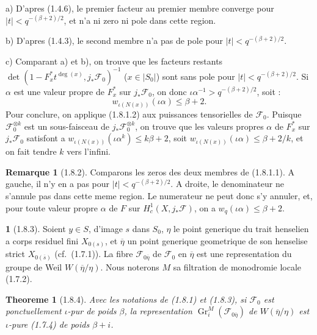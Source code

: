 \documentclass[12pt,a4paper]{article}
\theoremstyle{plain}
\newtheorem{theoreme}{Theoreme}[section]
\theoremstyle{definition}
\newtheorem{remarque}[theorem]{Remarque}
\theoremstyle{definition}
\newtheorem{para}{}[section]
\theoremstyle{remark}
\DeclareMathOperator{\Gr}{Gr}
\begin{document}
a) D'apres (1.4.6), le premier facteur au premier membre converge pour $|t| < q^{-(\beta+2)/2}$, et n'a ni zero ni pole dans cette region.

b) D'apres (1.4.3), le second membre n'a pas de pole pour $|t| < q^{-(\beta+2)/2}$.

c) Comparant a) et b), on trouve que les facteurs restants $\det(1 - F_x^* t^{\deg(x)}, j_* \mathscr{F}_0)^{-1}$ ($x \in |S_0|$) sont sans pole pour $|t| < q^{-(\beta+2)/2}$. Si $\alpha$ est une valeur propre de $F_x^*$ sur $j_* \mathscr{F}_0$, on donc $\iota\alpha^{-1} > q^{-(\beta+2)/2}$, soit :
\begin{equation}\tag{1.8.1.2}
w_{\iota(N(x))}(\iota\alpha) \leq \beta + 2.
\end{equation}
Pour conclure, on applique (1.8.1.2) aux puissances tensorielles de $\mathscr{F}_0$. Puisque $\mathscr{F}_0^{\otimes k}$ est un sous-faisceau de $j_* \mathscr{F}_0^{\otimes k}$, on trouve que les valeurs propres $\alpha$ de $F_x^*$ sur $j_* \mathscr{F}_0$ satisfont a $w_{\iota(N(x))}(\iota\alpha^k) \leq k\beta + 2$, soit $w_{\iota(N(x))}(\iota\alpha) \leq \beta + 2/k$, et on fait tendre $k$ vers l'infini.

\begin{remarque}[1.8.2]
Comparons les zeros des deux membres de (1.8.1.1). A gauche, il n'y en a pas pour $|t| < q^{-(\beta+2)/2}$. A droite, le denominateur ne s'annule pas dans cette meme region. Le numerateur ne peut donc s'y annuler, et, pour toute valeur propre $\alpha$ de $F$ sur $H_c^1(X, j_* \mathscr{F})$, on a $w_q(\iota\alpha) \leq \beta + 2$.
\end{remarque}

\begin{para}[1.8.3]
Soient $y \in S$, d'image $s$ dans $S_0$, $\eta$ le point generique du trait henselien a corps residuel fini $X_{0(s)}$, et $\overline{\eta}$ un point generique geometrique de son henselise strict $X_{0(\overline{s})}$ (cf.~(1.7.1)). La fibre $\mathscr{F}_{0\overline{\eta}}$ de $\mathscr{F}_0$ en $\overline{\eta}$ est une representation du groupe de Weil $W(\overline{\eta}/\eta)$. Nous noterons $M$ sa filtration de monodromie locale (1.7.2).
\end{para}

\begin{theoreme}[1.8.4]
Avec les notations de (1.8.1) et (1.8.3), si $\mathscr{F}_0$ est ponctuellement $\iota$-pur de poids $\beta$, la representation $\Gr_i^M(\mathscr{F}_{0\overline{\eta}})$ de $W(\overline{\eta}/\eta)$ est $\iota$-pure (1.7.4) de poids $\beta + i$.
\end{theoreme}
\end{document}
